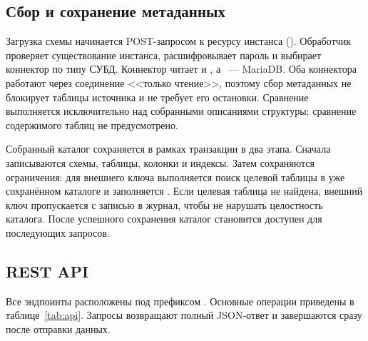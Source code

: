 \documentclass[../main.tex]{subfiles}
\begin{document}
\subsection{Сбор и сохранение метаданных}

Загрузка схемы начинается POST-запросом к ресурсу инстанса
(). Обработчик проверяет существование инстанса,
расшифровывает пароль и выбирает коннектор
по типу СУБД. Коннектор  читает
 и , а
~---  MariaDB.
Оба коннектора работают через соединение <<только чтение>>, поэтому
сбор метаданных не блокирует таблицы источника и не требует его
остановки. Сравнение выполняется исключительно над собранными
описаниями структуры; сравнение содержимого таблиц не предусмотрено.

Собранный каталог сохраняется в рамках транзакции в два этапа.
Сначала записываются схемы, таблицы, колонки и индексы. Затем
сохраняются ограничения: для внешнего ключа выполняется поиск
целевой таблицы в уже сохранённом каталоге и заполняется
. Если целевая таблица не найдена, внешний
ключ пропускается с записью в журнал, чтобы не нарушать целостность
каталога. После успешного сохранения каталог становится доступен
для последующих запросов.

\subsection{REST API}

Все эндпоинты расположены под префиксом . Основные
операции приведены в таблице~\ref{tab:api}. Запросы возвращают
полный JSON-ответ и завершаются сразу после отправки данных.
\end{document}
